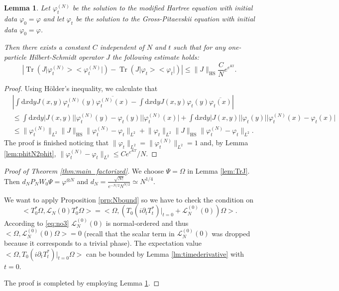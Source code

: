 \documentclass[11pt,a4paper,draft,DIV11]{scrartcl}	%
\newtheorem{lem}[thm]{Lemma}
\newcommand{\di}{\textrm{d}}		%
\newcommand{\Lcal}{\mathcal{L}}		%
\newcommand{\Ncal}{\mathcal{N}}		%
\newcommand{\scal}[2]{\big<#1,#2\big>} %
\newcommand{\cc}[1]{\overline{#1}}	%
\newcommand{\norm}[1]{\lVert#1\rVert}	%
\newcommand{\ph}{\varphi_t^{(N)}}	%
\newcommand{\project}[1]{\lvert #1 \big>\big< #1\rvert}	%
\newcommand{\Tr}{\operatorname{Tr}}	%
\newcommand{\bd}{\begin{displaymath}}			%
\newcommand{\ed}{\end{displaymath}}
\begin{document}
\begin{lem}
\label{lem:phNtoph}
Let $\ph$ be the solution to the modified Hartree equation with initial data $\varphi_0 = \varphi$ and let $\varphi_t$ be the solution to the Gross-Pitaevskii equation with initial data $\varphi_0 = \varphi$.

Then there exists a constant $C$ independent of $N$ and $t$ such that for any one-particle Hilbert-Schmidt operator $J$ the following estimate holds:
\bd
\left\lvert \Tr\left(J \project{\ph}\right) - \Tr\left(J \project{\varphi_t}\right) \right\rvert \leq \norm{J}_{\textrm{HS}} \frac{C}{N} e^{e^{Kt}}.
\ed
\end{lem}
\begin{proof}
Using H\"older's inequality, we calculate that
\begin{align*}
& \left\lvert \int \di x \di y J(x,y) \ph(y) \cc{\ph(x)} - \int \di x\di y J(x,y) \varphi_t(y) \cc{\varphi_t(x)} \right\rvert \\ 
& \leq \int \di x \di y \lvert J(x,y)\rvert \lvert \ph(y) - \varphi_t(y)\rvert \lvert \ph(x)\rvert + \int \di x \di y \lvert J(x,y) \rvert \lvert \varphi_t(y)\rvert \lvert \ph(x)-\varphi_t(x)\rvert \\
& \leq \norm{\ph}_{L^2} \norm{J}_{\textrm{HS}} \norm{\ph - \varphi_t}_{L^2} + \norm{\varphi_t}_{L^2} \norm{J}_{\textrm{HS}} \norm{\ph - \varphi_t}_{L^2}. 
\end{align*}
The proof is finished noticing that $\norm{\varphi_t}_{L^2} = \norm{\ph}_{L^2} = 1$ and, by Lemma \ref{lem:phitN2phit}, $\norm{\ph - \varphi_t}_{L^2} \leq C e^{e^{KT}}/N$.
\end{proof}

\begin{proof}[Proof of Theorem \ref{thm:main_factorized}]
We choose $\Psi = \Omega$ in Lemma \ref{lem:TrJ}. Then $d_N P_N W_0 \Psi = \varphi^{\otimes N}$ and $d_N = \frac{\sqrt{N!}}{e^{-N/2}N^{N/2}} \simeq N^{1/4}$.

We want to apply Proposition \ref{prp:Nbound}%
so we have to check the condition on 
\bd
\scal{T^\ast_0 \Omega}{\Lcal_N(0)T^\ast_0 \Omega} = \scal{\Omega}{\left(T_0(i\partial_t T^\ast_t)\rvert_{t=0} + \Lcal_N^{(0)}(0)\right)\Omega}.
\ed
According to \eqref{eq:no3} $\Lcal_N^{(0)}(0)$ is normal-ordered and thus $\scal{\Omega}{\Lcal_N^{(0)}(0)\Omega} = 0$ (recall that the scalar term in $\Lcal_N^{(0)}(0)$ was dropped because it corresponds to a trivial phase). The expectation value $\scal{\Omega}{T_0(i\partial_t T^\ast_t)\rvert_{t=0} \Omega}$ can be bounded by Lemma \ref{lm:timederivative} with $t=0$.

The proof is completed by employing Lemma \ref{lem:phNtoph}.
\end{proof}
\end{document}
